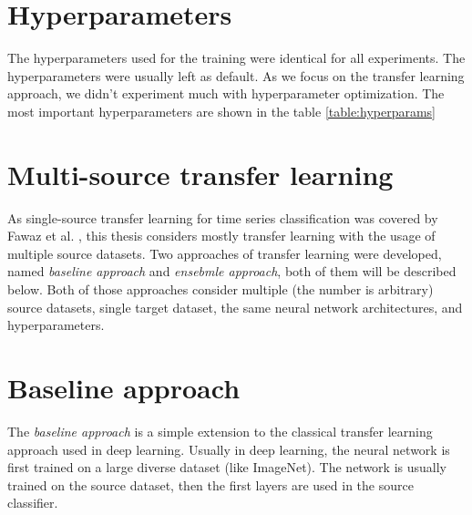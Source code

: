 \documentclass[a4paper,11pt,twoside]{report}
\theoremstyle{definition}
\begin{document}
\section{Hyperparameters}\label{section:hyperparameters}
The hyperparameters used for the training were identical for all experiments. The hyperparameters were usually left as default. As we focus on the transfer learning approach, we didn't experiment much with hyperparameter optimization. The most important hyperparameters are shown in the table
\FloatBarrier
\ref{table:hyperparams}
\begin{table}[!h]
\centering
\tabcolsep=0.11cm
\caption{Summary of hyperparameters.}
\label{table:hyperparams}
\end{table}
\FloatBarrier
\section{Multi-source transfer learning}
As single-source transfer learning for time series classification was covered by Fawaz et al. \cite{transfer_learning_time_series}, this thesis considers mostly transfer learning with the usage of multiple source datasets. Two approaches of transfer learning were developed, named \textit{baseline approach} and \textit{ensebmle approach}, both of them will be described below. Both of those approaches consider multiple (the number is arbitrary) source datasets, single target dataset, the same neural network architectures, and hyperparameters.

\section{Baseline approach}\label{section:baseline}
The \textit{baseline approach} is a simple extension to the classical transfer learning approach used in deep learning. Usually in deep learning, the neural network is first trained on a large diverse dataset (like ImageNet). The network is usually trained on the source dataset, then the first layers are used in the source classifier.
\end{document}
